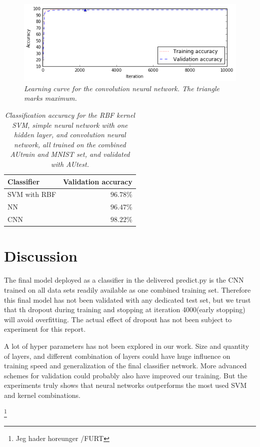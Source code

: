 \documentclass[a4paper,10pt,article,oneside,english]{memoir}
\let\oldcaption\caption
\renewcommand{\caption}[1]{\oldcaption{\emph{#1}}}
\begin{document}
	\begin{figure}[h!]
		\centering
		\includegraphics[width=0.9\linewidth]{cnn_learning.png}
		\caption{Learning curve for the convolution neural network. The triangle marks maximum.}
		\label{fig:cnn_learning}
	\end{figure}
	
	
	
	
	
	\begin{table}[h!]
		\centering
		\caption{Classification accuracy for the RBF kernel SVM, simple neural network with one hidden layer, and convolution neural network, all trained on the combined AUtrain and MNIST set, and validated with AUtest. }
		\label{tab:classifier_accuracy}
		\begin{tabular}{lr}
			Classifier & Validation accuracy \\ 
			\hline 
			SVM with RBF & $96.78\%$ \\ 
			NN & $96.47\%$ \\ 
			CNN & $98.22\%$ 
		\end{tabular} 
	\end{table}
	
	
	
	
	
	
	\chapter{Discussion}
	The final model deployed as a classifier in the delivered predict.py is the CNN trained on all data sets readily available as one combined training set. Therefore this final model has not been validated with any dedicated test set, but we trust that th dropout during training and stopping at iteration 4000(early stopping) will avoid overfitting. The actual effect of dropout has not been subject to experiment for this report. 
	
	A lot of hyper parameters has not been explored in our work. Size and quantity of layers, and different combination of layers could have huge influence on training speed and generalization of the final classifier network. More advanced schemes for validation could probably also have improved our training. 
	But the experiments truly shows that neural networks outperforms the most used SVM and kernel combinations.
	
	
	\footnote{Jeg hader horeunger  /FURT} 
	
	
\end{document}

